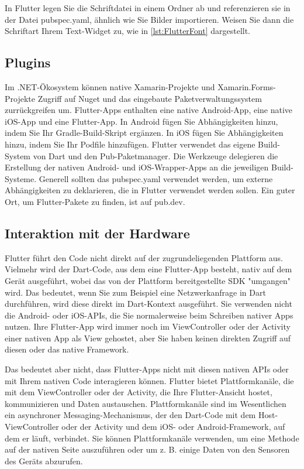 In Flutter legen Sie die Schriftdatei in einem Ordner ab und referenzieren sie in der Datei pubspec.yaml, ähnlich wie Sie Bilder importieren.
Weisen Sie dann die Schriftart Ihrem Text-Widget zu, wie in  \ref{lst:FlutterFont} dargestellt. 

\begin{minipage}{\linewidth}

\end{minipage}

\subsection{Plugins}
Im .NET-Ökosystem können native Xamarin-Projekte und Xamarin.Forms-Projekte Zugriff auf Nuget und das eingebaute Paketverwaltungssystem zurrückgreifen um.  Flutter-Apps enthalten eine native Android-App, eine native iOS-App und eine Flutter-App.
In Android fügen Sie Abhängigkeiten hinzu, indem Sie Ihr Gradle-Build-Skript ergänzen. In iOS fügen Sie Abhängigkeiten hinzu, indem Sie Ihr Podfile hinzufügen.
Flutter verwendet das eigene Build-System von Dart und den Pub-Paketmanager. Die Werkzeuge delegieren die Erstellung der nativen Android- und iOS-Wrapper-Apps an die jeweiligen Build-Systeme.
Generell sollten das pubspec.yaml verwendet werden, um externe Abhängigkeiten zu deklarieren, die in Flutter verwendet werden sollen. Ein guter Ort, um Flutter-Pakete zu finden, ist auf pub.dev.

\subsection{Interaktion mit der Hardware}

Flutter führt den Code nicht direkt auf der zugrundeliegenden Plattform aus. Vielmehr wird der Dart-Code, aus dem eine Flutter-App besteht, nativ auf dem Gerät ausgeführt, wobei das von der Plattform bereitgestellte SDK "umgangen" wird. Das bedeutet, wenn Sie zum Beispiel eine Netzwerkanfrage in Dart durchführen, wird diese direkt im Dart-Kontext ausgeführt. Sie verwenden nicht die Android- oder iOS-APIs, die Sie normalerweise beim Schreiben nativer Apps nutzen. Ihre Flutter-App wird immer noch im ViewController oder der Activity einer nativen App als View gehostet, aber Sie haben keinen direkten Zugriff auf diesen oder das native Framework.

Das bedeutet aber nicht, dass Flutter-Apps nicht mit diesen nativen APIs oder mit Ihrem nativen Code interagieren können. Flutter bietet Plattformkanäle, die mit dem ViewController oder der Activity, die Ihre Flutter-Ansicht hostet, kommunizieren und Daten austauschen. Plattformkanäle sind im Wesentlichen ein asynchroner Messaging-Mechanismus, der den Dart-Code mit dem Host-ViewController oder der Activity und dem iOS- oder Android-Framework, auf dem er läuft, verbindet. Sie können Plattformkanäle verwenden, um eine Methode auf der nativen Seite auszuführen oder um z. B. einige Daten von den Sensoren des Geräts abzurufen.

